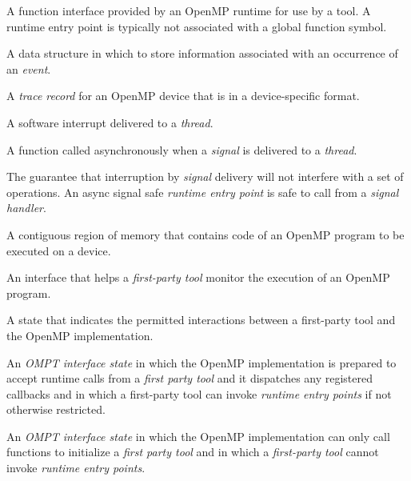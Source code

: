 \glossarydefstart
A function interface provided by an OpenMP runtime for use by a tool. 
A runtime entry point is typically not associated with a global function symbol.
\glossarydefend

\glossarydefstart
A data structure in which to store information associated with an 
occurrence of an \emph{event}.
\glossarydefend

\glossarydefstart
A \emph{trace record} for an OpenMP device that is in a device-specific format.
\glossarydefend

\glossarydefstart
A software interrupt delivered to a \emph{thread}.
\glossarydefend

\glossarydefstart
A function called asynchronously when a \emph{signal} is delivered to 
a \emph{thread}.
\glossarydefend

\glossarydefstart
The guarantee that interruption by \emph{signal} delivery will not
interfere with a set of operations.
An async signal safe \emph{runtime entry point} is safe to call 
from a \emph{signal handler}.
\glossarydefend

\glossarydefstart
A contiguous region of memory that contains code of an OpenMP program 
to be executed on a device.
\glossarydefend

\glossarydefstart
An interface that helps a \emph{first-party tool} monitor the execution 
of an OpenMP program.
\glossarydefend

\glossarydefstart
A state that indicates the permitted interactions between a first-party 
tool and the OpenMP implementation.
\glossarydefend

\glossarydefstart
An \emph{OMPT interface state} in which the OpenMP implementation is 
prepared to accept runtime calls from a \emph{first party tool} and it 
dispatches any registered callbacks and in which a first-party tool can 
invoke \emph{runtime entry points} if not otherwise restricted.
\glossarydefend

\glossarydefstart
An \emph{OMPT interface state} in which the OpenMP implementation can 
only call functions to initialize a \emph{first party tool} and in which 
a \emph{first-party tool} cannot invoke \emph{runtime entry points}.
\glossarydefend

